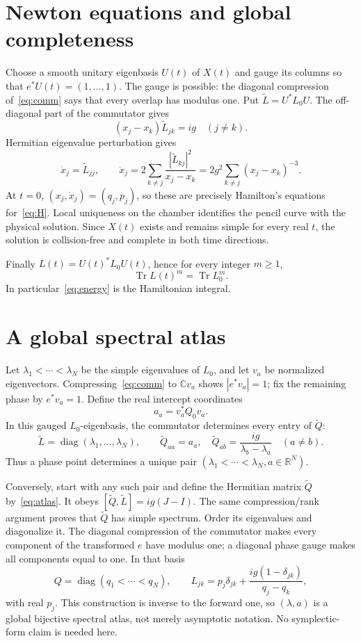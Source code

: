 \documentclass[9pt]{extarticle}
\begin{document}
\section{Newton equations and global completeness}
Choose a smooth unitary eigenbasis $U(t)$ of $X(t)$ and gauge its columns so
that $e^*U(t)=(1,\ldots,1)$.  The gauge is possible: the diagonal compression
of~\eqref{eq:comm} says that every overlap has modulus one.  Put
$\widetilde L=U^*L_0U$.  The off-diagonal part of the commutator gives
\begin{equation}\label{eq:off}
 (x_j-x_k)\widetilde L_{jk}=ig\quad(j\ne k).
\end{equation}
Hermitian eigenvalue perturbation gives
\[
 \dot x_j=\widetilde L_{jj},\qquad
 \ddot x_j=2\sum_{k\ne j}
 \frac{|\widetilde L_{kj}|^2}{x_j-x_k}
 =2g^2\sum_{k\ne j}(x_j-x_k)^{-3}.
\]
At $t=0$, $(x_j,\dot x_j)=(q_j,p_j)$, so these are precisely Hamilton's
equations for~\eqref{eq:H}.  Local uniqueness on the chamber identifies the
pencil curve with the physical solution.  Since $X(t)$ exists and remains
simple for every real $t$, the solution is collision-free and complete in
both time directions.

Finally $L(t)=U(t)^*L_0U(t)$, hence for every integer $m\ge1$,
\[
 \operatorname{Tr}L(t)^m=\operatorname{Tr}L_0^m.
\]
In particular~\eqref{eq:energy} is the Hamiltonian integral.

\section{A global spectral atlas}
Let $\lambda_1<\cdots<\lambda_N$ be the simple eigenvalues of $L_0$, and let
$v_a$ be normalized eigenvectors.  Compressing~\eqref{eq:comm} to
$\mathbb Cv_a$ shows $|e^*v_a|=1$; fix the remaining phase by $e^*v_a=1$.
Define the real intercept coordinates
\[
 a_a=v_a^*Q_0v_a.
\]
In this gauged $L_0$-eigenbasis, the commutator determines every entry of
$\widetilde Q$:
\begin{equation}\label{eq:atlas}
 \widetilde L=\operatorname{diag}(\lambda_1,\ldots,\lambda_N),\qquad
 \widetilde Q_{aa}=a_a,\quad
 \widetilde Q_{ab}=\frac{ig}{\lambda_b-\lambda_a}\quad(a\ne b).
\end{equation}
Thus a phase point determines a unique pair
$(\lambda_1<\cdots<\lambda_N,a\in\mathbb R^N)$.

Conversely, start with any such pair and define the Hermitian matrix
$\widetilde Q$ by~\eqref{eq:atlas}.  It obeys
$[\widetilde Q,\widetilde L]=ig(J-I)$.  The same compression/rank argument
proves that $\widetilde Q$ has simple spectrum.  Order its eigenvalues and
diagonalize it.  The diagonal compression of the commutator makes every
component of the transformed $e$ have modulus one; a diagonal phase gauge
makes all components equal to one.  In that basis
\[
 Q=\operatorname{diag}(q_1<\cdots<q_N),\qquad
 L_{jk}=p_j\delta_{jk}+\frac{ig(1-\delta_{jk})}{q_j-q_k},
\]
with real $p_j$.  This construction is inverse to the forward one, so
$(\lambda,a)$ is a global bijective spectral atlas, not merely asymptotic
notation.  No symplectic-form claim is needed here.
\end{document}

